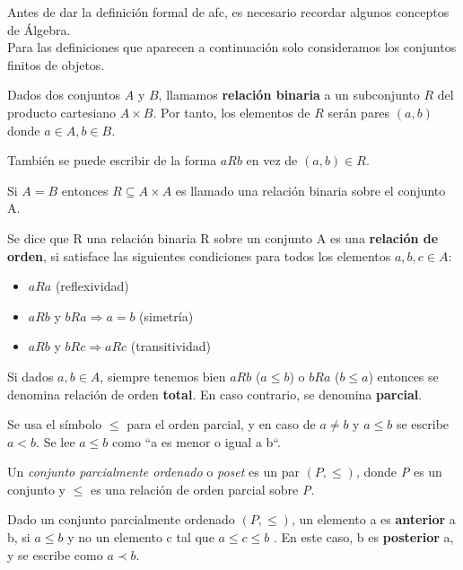 \documentclass[../../main.tex]{subfiles}
\begin{document}
Antes de dar la definición formal de \gls{afc}, es necesario recordar algunos conceptos de Álgebra.  \\

Para las definiciones que aparecen a continuación solo consideramos los conjuntos finitos de objetos.

\begin{definicion}
Dados dos conjuntos $A$ y $B$, llamamos \textbf{relación binaria} a un subconjunto $R$ del producto cartesiano $A\times B$. Por tanto, los elementos de $R$ serán pares $(a,b)$ donde $a\in A, b\in B$.
\end{definicion}

También se puede escribir de la forma $aRb$ en vez de $(a,b) \in R$. 

Si $A = B$ entonces $R \subseteq A \times A$ es llamado una relación binaria sobre el conjunto A.


\begin{definicion}
Se dice que R una relación binaria R sobre un conjunto A es una \textbf{relación de orden}, si satisface las siguientes condiciones para todos los elementos $a,b,c \in A$:
\begin{itemize}
    \item $aRa$ (reflexividad)
    \item $aRb$ y $bRa \Longrightarrow a = b$ (simetría)
    \item $aRb$ y $bRc \Longrightarrow aRc$ (transitividad)
\end{itemize}
\end{definicion}

Si dados $a, b\in A$, siempre tenemos bien $aRb$ ($a\le b$) o $bRa$ ($b\le a$) entonces se denomina relación de orden \textbf{total}. En caso contrario, se denomina \textbf{parcial}. 

Se usa el símbolo $\leq$ para el orden parcial, y en caso de $a \neq b$ y $a \leq b$ se escribe $a < b$. Se lee $a \le b$ como ``a es menor o igual a b``. 

\begin{definicion}
Un \textit{conjunto parcialmente ordenado} o \textit{poset} es un par $(P, \leq)$, donde \textit{P} es un conjunto y $\leq$ es una relación de orden parcial sobre \textit{P}.
\end{definicion}

\begin{definicion}
Dado un conjunto parcialmente ordenado $(P,\leq)$, un elemento a es \textbf{anterior} a b, si $a \leq b$ y no un elemento c tal que $a \leq c \leq b$ . En este caso, b es \textbf{posterior} a, y se escribe como $a \prec b$.
\end{definicion}
\end{document}
